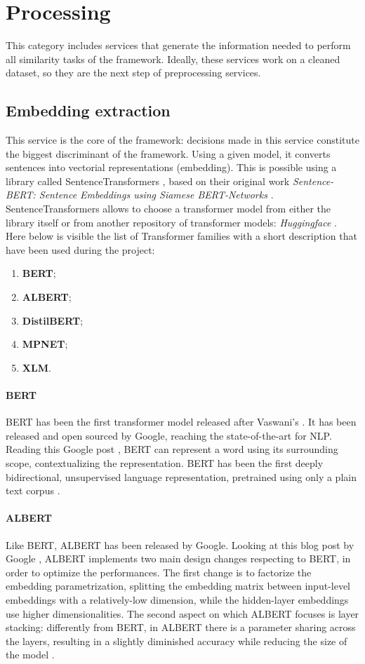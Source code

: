 \documentclass[\main/main.tex]{subfiles}
\begin{document}
\section{Processing}
This category includes services that generate the information needed to perform all similarity tasks of the framework. Ideally, these services work on a cleaned dataset, so they are the next step of preprocessing services. 
\subsection{Embedding extraction}
This service is the core of the framework: decisions made in this service constitute the biggest discriminant of the framework. Using a given model, it converts sentences into vectorial representations (embedding). This is possible using a library called SentenceTransformers \cite{sbert}, based on their original work \emph{Sentence-BERT: Sentence Embeddings using Siamese BERT-Networks} \cite{reimers2019sentencebert}. SentenceTransformers allows to choose a transformer model from either the library itself or from another repository of transformer models: \emph{Huggingface} \cite{huggingface}. Here below is visible the list of Transformer families with a short description that have been used during the project:
\begin{enumerate}
    \item \textbf{BERT};
    \item \textbf{ALBERT};
    \item \textbf{DistilBERT};
    \item \textbf{MPNET};
    \item \textbf{XLM}.
\end{enumerate} 
\paragraph{BERT}
BERT has been the first transformer model released after Vaswani's \cite{vaswani2017attention}. It has been released and open sourced by Google, reaching the state-of-the-art for NLP. Reading this Google post \cite{bert_blog_post}, BERT can represent a word using its surrounding scope, contextualizing the representation. BERT has been the first deeply bidirectional, unsupervised language representation, pretrained using only a plain text corpus \cite{DBLP:journals/corr/abs-1810-04805}.
\paragraph{ALBERT}
Like BERT, ALBERT has been released by Google. Looking at this blog post by Google \cite{albert_blog_post}, ALBERT implements two main design changes respecting to BERT, in order to optimize the performances. The first change is to factorize the embedding parametrization, splitting the embedding matrix between input-level embeddings with a relatively-low dimension, while the hidden-layer embeddings use higher dimensionalities. The second aspect on which ALBERT focuses is layer stacking: differently from BERT, in ALBERT there is a parameter sharing across the layers, resulting in a slightly diminished accuracy while reducing the size of the model \cite{DBLP:journals/corr/abs-1909-11942}.
\end{document}
